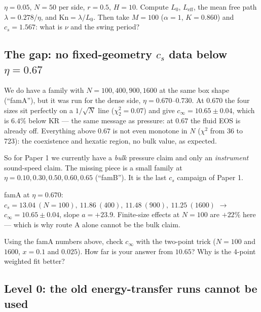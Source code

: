 \documentclass[11pt,a4paper]{article}
\begin{document}
\begin{ex}[Exercise 2]
$\eta = 0.05$, $N = 50$ per side, $r = 0.5$, $H = 10$. Compute $L_0$, $L_{\mathrm{eff}}$, the mean free path $\lambda = 0.278/\eta$, and $\mathrm{Kn} = \lambda/L_0$. Then take $M = 100$ ($\alpha = 1$, $K = 0.860$) and $c_s = 1.567$: what is $\nu$ and the swing period?
\end{ex}

\subsection{The gap: no fixed-geometry $c_s$ data below $\eta = 0.67$}

\begin{eli}
We do have a family with $N = 100, 400, 900, 1600$ at the same box shape (``famA''), but it was run for the dense side, $\eta = 0.670$--$0.730$. At $0.670$ the four sizes sit perfectly on a $1/\sqrt N$ line ($\chi^2_2 = 0.07$) and give $c_\infty = 10.65\pm0.04$, which is $6.4\%$ below KR --- the same message as pressure: at $0.67$ the fluid EOS is already off. Everything above $0.67$ is not even monotone in $N$ ($\chi^2$ from 36 to 723): the coexistence and hexatic region, no bulk value, as expected.

So for Paper 1 we currently have a \emph{bulk} pressure claim and only an \emph{instrument} sound-speed claim. The missing piece is a small family at $\eta = 0.10, 0.30, 0.50, 0.60, 0.65$ (``famB''). It is the last $c_s$ campaign of Paper 1.
\end{eli}

\begin{num}
famA at $\eta = 0.670$: $c_s = 13.04\ (N{=}100),\ 11.86\ (400),\ 11.48\ (900),\ 11.25\ (1600)$ $\to$ $c_\infty = 10.65\pm0.04$, slope $a = +23.9$. Finite-size effects at $N = 100$ are $+22\%$ here --- which is why route A alone cannot be the bulk claim.
\end{num}

\begin{ex}[Exercise 3]
Using the famA numbers above, check $c_\infty$ with the two-point trick ($N = 100$ and $1600$, $x = 0.1$ and $0.025$). How far is your answer from $10.65$? Why is the 4-point weighted fit better?
\end{ex}

\subsection{Level 0: the old energy-transfer runs cannot be used}
\end{document}
